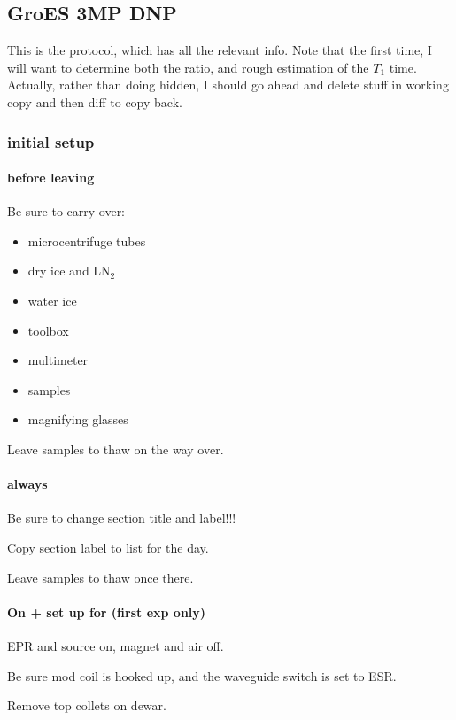 \subsection{GroES 3MP DNP}\label{sec:groes3mpreprod_groesdnprep2}
\timeblockstart
{}
This is the protocol, which has all the relevant info.
Note that the first time, I will want to determine both the ratio, and rough estimation of the $T_1$ time.
Actually, rather than doing hidden, I should go ahead and delete stuff in working copy and then diff to copy back.

\subsubsection{initial setup}
\paragraph{before leaving}
Be sure to carry over:
\begin{itemize}
    \item microcentrifuge tubes
    \item dry ice and LN$_2$
    \item water ice 
    \item toolbox 
    \item multimeter 
    \item samples
    \item magnifying glasses
\end{itemize}
Leave samples to thaw on the way over.

\paragraph{always}
Be sure to change section title and label!!!

Copy section label to list for the day.

Leave samples to thaw once there.

\paragraph{On + set up for (first exp only)}

EPR and source on, magnet and air off.

Be sure mod coil is hooked up, and the waveguide switch is set to ESR.

Remove top collets on dewar.

